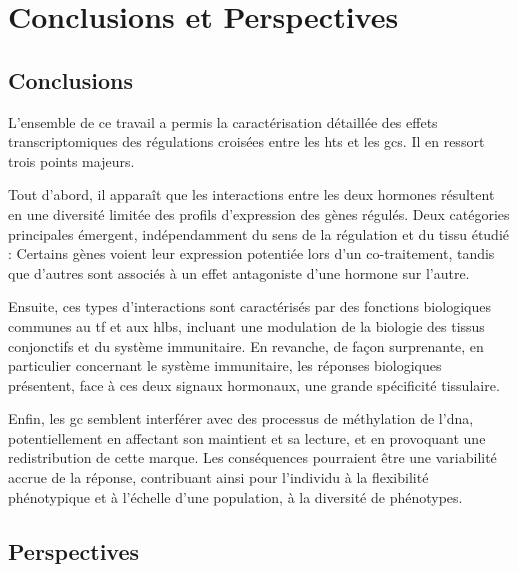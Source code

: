 \documentclass[../main.tex]{subfiles}
\begin{document}
\chapter{Conclusions et Perspectives}


\section{Conclusions}

	L'ensemble de ce travail a permis la caractérisation détaillée des effets transcriptomiques des régulations croisées entre les \glspl{ht} et les \glspl{gc}.
	Il en ressort trois points majeurs.
	\par
	Tout d'abord, il apparaît que les interactions entre les deux hormones résultent en une diversité limitée des profils d'expression des gènes régulés.
	Deux catégories principales émergent, indépendamment du sens de la régulation et du tissu étudié :
	Certains gènes voient leur expression potentiée lors d'un co-traitement, tandis que d'autres sont associés à un effet antagoniste d'une hormone sur l'autre.
	\par
	Ensuite, ces types d'interactions sont caractérisés par des fonctions biologiques communes au \gls{tf} et aux \glspl{hlb}, incluant une modulation de la biologie des tissus conjonctifs et du système immunitaire.
	En revanche, de façon surprenante, en particulier concernant le système immunitaire, les réponses biologiques présentent, face à ces deux signaux hormonaux, une grande spécificité tissulaire.
	\par
	Enfin, les \gls{gc} semblent interférer avec des processus de méthylation de l'\gls{dna}, potentiellement en affectant son maintient et sa lecture, et en provoquant une redistribution de cette marque.
	Les conséquences pourraient être une variabilité accrue de la réponse, contribuant ainsi pour l'individu à la flexibilité phénotypique et à l'échelle d'une population, à la diversité de phénotypes.


\section{Perspectives}
\end{document}
